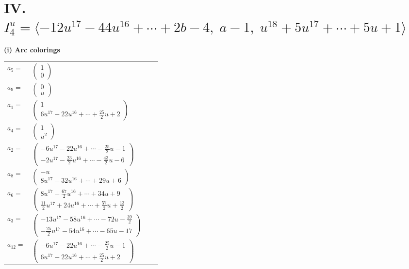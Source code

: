 \documentclass[1p]{elsarticle_modified}
\theoremstyle{definition}
\begin{document}
\centering \section*{IV. $I^u_{4}= \langle -12 u^{17}-44 u^{16}+\cdots+2 b-4,\;a-1,\;u^{18}+5 u^{17}+\cdots+5 u+1 \rangle$}
\flushleft \textbf{(i) Arc colorings}\\
\begin{tabular}{m{7pt} m{180pt} m{7pt} m{180pt} }
\flushright $a_{5}=$&$\begin{pmatrix}1\\0\end{pmatrix}$ \\
\flushright $a_{9}=$&$\begin{pmatrix}0\\u\end{pmatrix}$ \\
\flushright $a_{1}=$&$\begin{pmatrix}1\\6 u^{17}+22 u^{16}+\cdots+\frac{25}{2} u+2\end{pmatrix}$ \\
\flushright $a_{4}=$&$\begin{pmatrix}1\\u^2\end{pmatrix}$ \\
\flushright $a_{2}=$&$\begin{pmatrix}-6 u^{17}-22 u^{16}+\cdots-\frac{25}{2} u-1\\-2 u^{17}-\frac{23}{2} u^{16}+\cdots-\frac{43}{2} u-6\end{pmatrix}$ \\
\flushright $a_{8}=$&$\begin{pmatrix}- u\\8 u^{17}+32 u^{16}+\cdots+29 u+6\end{pmatrix}$ \\
\flushright $a_{6}=$&$\begin{pmatrix}8 u^{17}+\frac{67}{2} u^{16}+\cdots+34 u+9\\\frac{11}{2} u^{17}+24 u^{16}+\cdots+\frac{57}{2} u+\frac{13}{2}\end{pmatrix}$ \\
\flushright $a_{3}=$&$\begin{pmatrix}-13 u^{17}-58 u^{16}+\cdots-72 u-\frac{39}{2}\\-\frac{25}{2} u^{17}-54 u^{16}+\cdots-65 u-17\end{pmatrix}$ \\
\flushright $a_{12}=$&$\begin{pmatrix}-6 u^{17}-22 u^{16}+\cdots-\frac{25}{2} u-1\\6 u^{17}+22 u^{16}+\cdots+\frac{25}{2} u+2\end{pmatrix}$ \\

\end{tabular}
\end{document}
